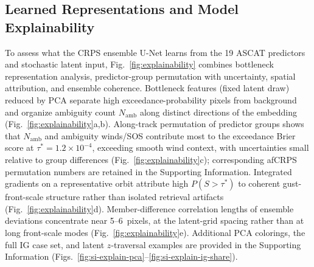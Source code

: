 \subsection{Learned Representations and Model Explainability}

To assess what the CRPS ensemble U-Net learns from the 19 ASCAT predictors and
stochastic latent input, Fig.~\ref{fig:explainability} combines bottleneck
representation analysis, predictor-group permutation with uncertainty,
spatial attribution, and ensemble coherence.
Bottleneck features (fixed latent draw) reduced by PCA separate high
exceedance-probability pixels from background and organize ambiguity count
$N_{\mathrm{amb}}$ along distinct directions of the embedding
(Fig.~\ref{fig:explainability}a,b).
Along-track permutation of predictor groups shows that
$N_{\mathrm{amb}}$ and ambiguity winds/SOS contribute most to the exceedance
Brier score at $\tau^*=1.2\times10^{-4}$, exceeding smooth wind context, with
uncertainties small relative to group differences
(Fig.~\ref{fig:explainability}c); corresponding afCRPS permutation numbers are
retained in the Supporting Information.
Integrated gradients on a representative orbit attribute high $P(S>\tau^*)$ to
coherent gust-front-scale structure rather than isolated retrieval artifacts
(Fig.~\ref{fig:explainability}d).
Member-difference correlation lengths of ensemble deviations concentrate near
5--6~pixels, at the latent-grid spacing rather than at long front-scale modes
(Fig.~\ref{fig:explainability}e).
Additional PCA colorings, the full IG case set, and latent $z$-traversal
examples are provided in the Supporting Information
(Figs.~\ref{fig:si-explain-pca}--\ref{fig:si-explain-ig-share}).
